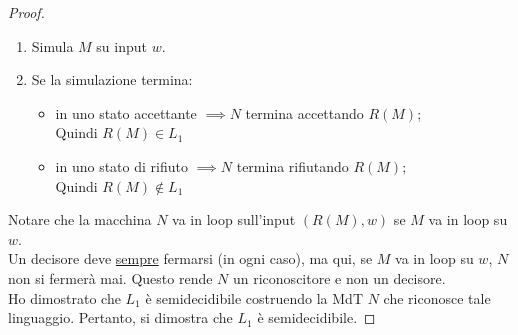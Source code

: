\documentclass{article}  %
\theoremstyle{definition}
\begin{document}
\begin{esercizio}[Esercizio 2.1]
\begin{proof}
\begin{enumerate}
			\item Simula $M$ su input $w$.
			\item Se la simulazione termina:
			      \begin{itemize}
				      \item in uno stato accettante $\implies N$ termina accettando $R(M)$; \\ Quindi $R(M) \in L_1$
				      \item in uno stato di rifiuto $\implies N$ termina rifiutando $R(M)$; \\ Quindi $R(M) \notin L_1$
			      \end{itemize}
		\end{enumerate}
		Notare che la macchina $N$ va in loop sull'input $(R(M),w)$ se $M$ va in loop su $w$. \\
		Un decisore deve \underline{sempre} fermarsi (in ogni caso), ma qui, se $M$ va in loop su $w$, $N$ non si fermerà mai.
		Questo rende $N$ un riconoscitore e non un decisore. \\
		Ho dimostrato che $L_1$ è semidecidibile costruendo la MdT $N$ che riconosce tale linguaggio.
		Pertanto, si dimostra che $L_1$ è semidecidibile.
	\end{proof}
\end{esercizio}
\end{document}

